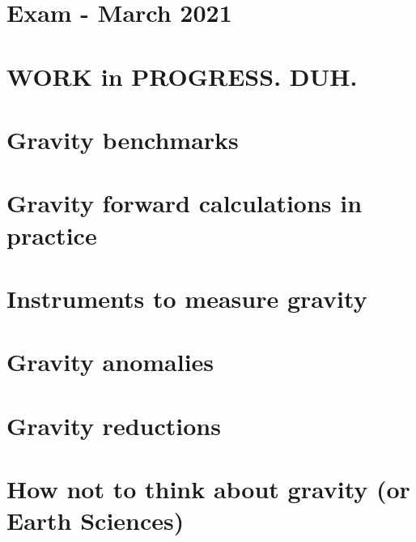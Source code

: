 \section{Exam - March 2021} 

\newpage
\section{WORK in PROGRESS. DUH.} %

\section{Gravity benchmarks} 

\newpage
\section{Gravity forward calculations in practice} 
\section{Instruments to measure gravity} 
\section{Gravity anomalies} 
\section{Gravity reductions} 
\section{How not to think about gravity (or Earth Sciences)} 
